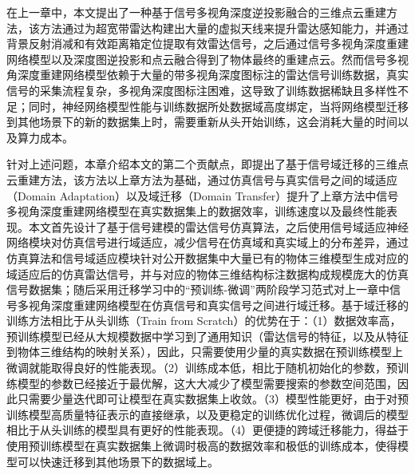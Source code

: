 在上一章中，本文提出了一种基于信号多视角深度逆投影融合的三维点云重建方法，该方法通过为超宽带雷达构建出大量的虚拟天线来提升雷达感知能力，并通过背景反射消减和有效距离箱定位提取有效雷达信号，之后通过信号多视角深度重建网络模型以及深度图逆投影和点云融合得到了物体最终的重建点云。然而信号多视角深度重建网络模型依赖于大量的带多视角深度图标注的雷达信号训练数据，真实信号的采集流程复杂，多视角深度图标注困难，这导致了训练数据稀缺且多样性不足；同时，神经网络模型性能与训练数据所处数据域高度绑定，当将网络模型迁移到其他场景下的新的数据集上时，需要重新从头开始训练，这会消耗大量的时间以及算力成本。

针对上述问题，本章介绍本文的第二个贡献点，即提出了基于信号域迁移的三维点云重建方法，该方法以上章方法为基础，通过仿真信号与真实信号之间的域适应（Domain Adaptation）以及域迁移（Domain Transfer）提升了上章方法中信号多视角深度重建网络模型在真实数据集上的数据效率，训练速度以及最终性能表现。本文首先设计了基于信号建模的雷达信号仿真算法，之后使用信号域适应神经网络模块对仿真信号进行域适应，减少信号在仿真域和真实域上的分布差异，通过仿真算法和信号域适应模块针对公开数据集中大量已有的物体三维模型生成对应的域适应后的仿真雷达信号，并与对应的物体三维结构标注数据构成规模庞大的仿真信号数据集；随后采用迁移学习中的“预训练-微调”两阶段学习范式对上一章中信号多视角深度重建网络模型在仿真信号和真实信号之间进行域迁移。基于域迁移的训练方法相比于从头训练（Train from Scratch）的优势在于：（1）数据效率高，预训练模型已经从大规模数据中学习到了通用知识（雷达信号的特征，以及从特征到物体三维结构的映射关系），因此，只需要使用少量的真实数据在预训练模型上微调就能取得良好的性能表现。（2）训练成本低，相比于随机初始化的参数，预训练模型的参数已经接近于最优解，这大大减少了模型需要搜索的参数空间范围，因此只需要少量迭代即可让模型在真实数据集上收敛。（3）模型性能更好，由于对预训练模型高质量特征表示的直接继承，以及更稳定的训练优化过程，微调后的模型相比于从头训练的模型具有更好的性能表现。（4）更便捷的跨域迁移能力，得益于使用预训练模型在真实数据集上微调时极高的数据效率和极低的训练成本，使得模型可以快速迁移到其他场景下的数据域上。


